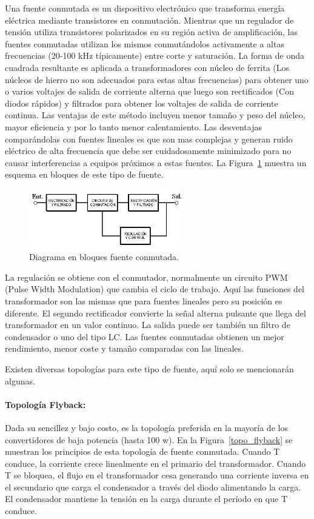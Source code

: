 Una fuente conmutada es un dispositivo electrónico que transforma energía eléctrica mediante transistores en conmutación. Mientras que un regulador de tensión utiliza transistores polarizados en su región activa de amplificación, las fuentes conmutadas utilizan los mismos conmutándolos activamente a altas frecuencias (20-100 kHz típicamente) entre corte y saturación. La forma de onda cuadrada resultante es aplicada a transformadores con núcleo de ferrita (Los núcleos de hierro no son adecuados para estas altas frecuencias) para obtener uno o varios voltajes de salida de corriente alterna que luego son rectificados (Con diodos rápidos) y filtrados para obtener los voltajes de salida de corriente continua. Las ventajas de este método incluyen menor tamaño y peso del núcleo, mayor eficiencia y por lo tanto menor calentamiento. Las desventajas comparándolas con fuentes lineales es que son mas complejas y generan ruido eléctrico de alta frecuencia que debe ser cuidadosamente minimizado para no causar interferencias a equipos próximos a estas fuentes. La Figura~\ref{fuente_conmutada_esquema_bloq} muestra un esquema en bloques de este tipo de fuente.

\begin{figure}[H]
\centering
\includegraphics[width=0.6\textwidth]{img/fuente_conmutada_esquema.jpg}
\caption{Diagrama en bloques fuente conmutada.}
\label{fuente_conmutada_esquema_bloq} 
\end{figure}


La regulación se obtiene con el conmutador, normalmente un circuito PWM (Pulse Width Modulation) que cambia el ciclo de trabajo. Aquí las funciones del transformador son las mismas que para fuentes lineales pero su posición es diferente. El segundo rectificador convierte la señal alterna pulsante que llega del transformador en un valor continuo. La salida puede ser también un filtro de condensador o uno del tipo LC. Las fuentes conmutadas obtienen un mejor rendimiento, menor coste y tamaño comparadas con las lineales.

Existen diversas topologías para este tipo de fuente, aquí solo se mencionarán algunas.

\paragraph*{Topología Flyback: }
Dada su sencillez y bajo costo, es la topología preferida en la mayoría de los convertidores de baja potencia (hasta 100 w). En la Figura~\ref{topo_flyback} se muestran los principios de esta topología de fuente conmutada. Cuando T conduce, la corriente crece linealmente en el primario del transformador. Cuando T se bloquea, el flujo en el transformador cesa generando una corriente inversa en el secundario que carga el condensador a través del diodo alimentando la carga. El condensador mantiene la tensión en la carga durante el período en que T conduce.


